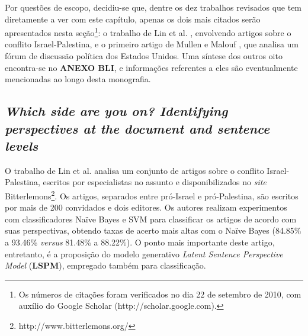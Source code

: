 
Por questões de escopo, decidiu-se que, dentre os dez trabalhos revisados que tem diretamente a ver com este capítulo, apenas os dois mais citados  serão apresentados nesta seção\footnote{Os números de citações foram verificados no dia 22 de setembro de 2010, com auxílio do Google Scholar (http://scholar.google.com).}: o trabalho de Lin et al. \cite{lin-et-al2006}, envolvendo artigos sobre o conflito Israel-Palestina, e o primeiro artigo de Mullen e Malouf \cite{aaai-politics}, que analisa um fórum de discussão política dos Estados Unidos. Uma síntese dos outros oito encontra-se no \textbf{ANEXO BLI}, e informações referentes a eles são eventualmente mencionadas ao longo desta monografia.

\subsection{\emph{Which side are you on? Identifying perspectives at the document and sentence levels}}

O trabalho de Lin et al. analisa um conjunto de artigos sobre o conflito Israel-Palestina, escritos por especialistas no assunto e disponibilizados no \emph{site} Bitterlemons\footnote{http://www.bitterlemons.org/}. Os artigos, separados entre pró-Israel e pró-Palestina, são escritos por mais de 200 convidados e dois editores. Os autores realizam experimentos com classificadores Naïve Bayes e SVM para classificar os artigos de acordo com suas perspectivas, obtendo taxas de acerto mais altas com o Naïve Bayes (84.85\% a 93.46\% \emph{versus} 81.48\% a 88.22\%). O ponto mais importante deste artigo, entretanto, é a proposição do modelo generativo \emph{Latent Sentence Perspective Model} (\textbf{LSPM}), empregado também para classificação. %

